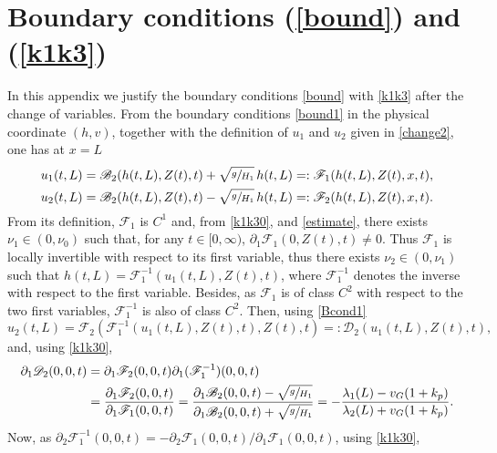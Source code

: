 \documentclass[11pt]{article}
\numberwithin{equation}{section}
\let\mathcal\mathscr
\theoremstyle{definition}
\begin{document}
\section{Boundary conditions (\ref{bound}) and (\ref{k1k3})}
\label{boundary}
In this appendix we justify the boundary conditions \eqref{bound} with \eqref{k1k3} after the change of variables. From the boundary conditions \eqref{bound1} in the physical coordinate $(h,v)$, together with the definition of $u_{1}$ and $u_{2}$
given in \eqref{change2}, one has at $x=L$
\begin{equation}
\begin{split}
u_{1}(t,L)=\mathcal{B}_{2}(h(t,L),Z(t),t)+\sqrt{\sfrac{g}{H_{1}}}\,h(t,L)=:\mathcal{F}_{1}(h(t,L),Z(t),x,t),\\
u_{2}(t,L)=\mathcal{B}_{2}(h(t,L),Z(t),t)-\sqrt{\sfrac{g}{H_{1}}}\,h(t,L)=:\mathcal{F}_{2}(h(t,L),Z(t),x,t).
\end{split}
\label{Bcond1}
\end{equation}
From its definition, $\mathcal{F}_{1}$ is $C^{1}$ and, from \eqref{k1k30}, and \eqref{estimate}, there exists $\nu_{1}\in(0,\nu_{0})$ such that, for any $t\in[0,\infty)$, $\partial_{1}{\mathcal{F}_{1}}(0,Z(t),t)\neq 0$. Thus $\mathcal{F}_{1}$ is locally invertible with respect to its first variable, thus
there exists $\nu_{2}\in(0,{\nu_{1}})$ such that
$h(t,L)=\mathcal{F}_{1}^{-1}(u_{1}(t,L),Z(t),t)$, where $\mathcal{F}_{1}^{-1}$ denotes the inverse with respect to the first variable. Besides, as $\mathcal{F}_{1}$ is of class $C^{2}$ with respect to the two first variables, $\mathcal{F}_{1}^{-1}$ is also of class $C^{2}$. Then, using \eqref{Bcond1}
\begin{equation*}
u_{2}(t,L)=\mathcal{F}_{2}(\mathcal{F}_{1}^{-1}(u_{1}(t,L),Z(t),t),Z(t),t)=:\mathcal{D}_{2}(u_{1}(t,L),Z(t),t),
\end{equation*}
and, using \eqref{k1k30},
\begin{equation*}
\begin{split}
\partial_{1}\mathcal{D}_{2}(0,0,t)&=\partial_{1}\mathcal{F}_{2}(0,0,t)\partial_{1}(\mathcal{F}_{1}^{-1})(0,0,t)\\
&=\frac{\partial_{1}\mathcal{F}_{2}(0,0,t)}{\partial_{1}\mathcal{F}_{1}(0,0,t)}=\frac{\partial_{1}\mathcal{B}_{2}(0,0,t)-\sqrt{\sfrac{g}{H_{1}}}}{\partial_{1}\mathcal{B}_{2}(0,0,t)+\sqrt{\sfrac{g}{H_{1}}}}=-\frac{\lambda_{1}(L)-v_{G}(1+k_{p})}{\lambda_{2}(L)+v_{G}(1+k_{p})}.
\end{split}
\end{equation*}
Now, as $\partial_{2}\mathcal{F}_{1}^{-1}(0,0,t)=-\partial_{2}\mathcal{F}_{1}(0,0,t)/\partial_{1}\mathcal{F}_{1}(0,0,t)$, using \eqref{k1k30},
\end{document}
